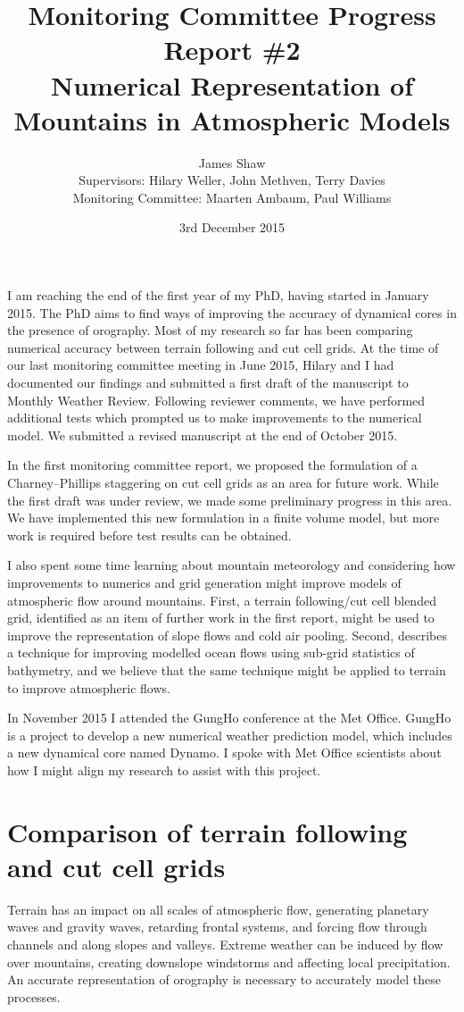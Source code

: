 \documentclass[a4paper]{article}
\title{Monitoring Committee Progress Report \#2\\
\vspace*{1em}
\Large{Numerical Representation of Mountains in Atmospheric Models}}
\author{James Shaw
\vspace{0.5em} \\
\large{Supervisors: Hilary Weller, John Methven, Terry Davies}
\vspace{0.5em} \\
\large{Monitoring Committee: Maarten Ambaum, Paul Williams}}
\date{3rd December 2015}
\begin{document}
\newcommand{\exner}{\Pi}
\newcommand{\TODO}[1]{\textcolor{purple}{TODO: \emph{#1}}}
\maketitle


I am reaching the end of the first year of my PhD, having started in January 2015.
The PhD aims to find ways of improving the accuracy of dynamical cores in the presence of orography.
Most of my research so far has been comparing numerical accuracy between terrain following and cut cell grids.
At the time of our last monitoring committee meeting in June 2015, Hilary and I had documented our findings and submitted a first draft of the manuscript to Monthly Weather Review.  Following reviewer comments, we have performed additional tests which prompted us to make improvements to the numerical model.  We submitted a revised manuscript at the end of October 2015.

In the first monitoring committee report, we proposed the formulation of a Charney--Phillips staggering on cut cell grids as an area for future work.  While the first draft was under review, we made some preliminary progress in this area.  We have implemented this new formulation in a finite volume model, but more work is required before test results can be obtained.

I also spent some time learning about mountain meteorology and considering how improvements to numerics and grid generation might improve models of atmospheric flow around mountains.  First, a terrain following/cut cell blended grid, identified as an item of further work in the first report, might be used to improve the representation of slope flows and cold air pooling.  Second, \citet{adcroft2013} describes a technique for improving modelled ocean flows using sub-grid statistics of bathymetry, and we believe that the same technique might be applied to terrain to improve atmospheric flows.

In November 2015 I attended the GungHo conference at the Met Office.  GungHo is a project to develop a new numerical weather prediction model, which includes a new dynamical core named Dynamo.  I spoke with Met Office scientists about how I might align my research to assist with this project.

\section{Comparison of terrain following and cut cell grids}
Terrain has an impact on all scales of atmospheric flow, generating planetary waves and gravity waves, retarding frontal systems, and forcing flow through channels and along slopes and valleys.  Extreme weather can be induced by flow over mountains, creating downslope windstorms and affecting local precipitation.  An accurate representation of orography is necessary to accurately model these processes.
\end{document}
